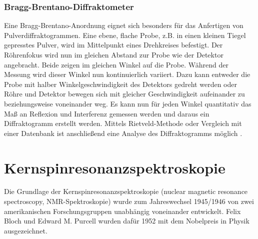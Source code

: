\documentclass[a4paper, 11pt, headsepline,footsepline,twoside,abstract]{scrbook}
\begin{document}
\subsubsection{Bragg-Brentano-Diffraktometer}
Eine Bragg-Brentano-Anordnung eignet sich besonders für das Anfertigen von Pulverdiffraktogrammen. Eine ebene, flache Probe, z.B. in einen kleinen Tiegel gepresstes Pulver, wird im Mittelpunkt eines Drehkreises befestigt. Der Röhrenfokus wird nun im gleichen Abstand zur Probe wie der Detektor angebracht. Beide zeigen im gleichen Winkel auf die Probe. Während der Messung wird dieser Winkel nun kontinuierlich variiert. Dazu kann entweder die Probe mit halber Winkelgeschwindigkeit des Detektors gedreht werden oder Röhre und Detektor bewegen sich mit gleicher Geschwindigkeit aufeinander zu beziehungsweise voneinander weg. Es kann nun für jeden Winkel quantitativ das Maß an Reflexion und Interferenz gemessen werden und daraus ein Diffraktogramm erstellt werden. Mittels Rietveld-Methode oder Vergleich mit einer Datenbank ist anschließend eine Analyse des Diffraktogramms möglich \cite{krischner1994}.
\section{Kernspinresonanzspektroskopie}
Die Grundlage der Kernspinresonanzspektroskopie (nuclear magnetic resonance spectroscopy, NMR-Spektroskopie) wurde zum Jahreswechsel 1945/1946 von zwei amerikanischen Forschungsgruppen unabhängig voneinander entwickelt. Felix Bloch und Edward M. Purcell wurden dafür 1952 mit dem Nobelpreis in Physik ausgezeichnet.
\end{document}
